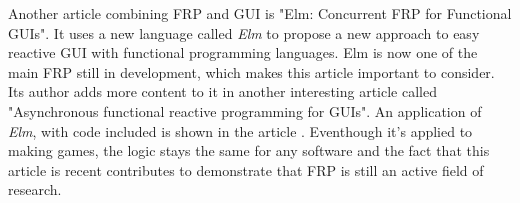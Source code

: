 \documentclass[a4paper]{scrartcl}
\begin{document}
Another article combining FRP and GUI is "Elm: Concurrent FRP for Functional GUIs"\cite{czaplicki2012elm}. It uses a new language called \textit{Elm} to propose a new approach to easy reactive GUI with functional programming languages. Elm is now one of the main FRP still in development, which makes this article important to consider. Its author adds more content to it in another interesting article called "Asynchronous functional reactive programming for GUIs"\cite{czaplicki2013asynchronous}. An application of \textit{Elm}, with code included is shown in the article \cite{kraeutmann2015functional}. Eventhough it's applied to making games, the logic stays the same for any software and the fact that this article is recent contributes to demonstrate that FRP is still an active field of research.





\end{document}
